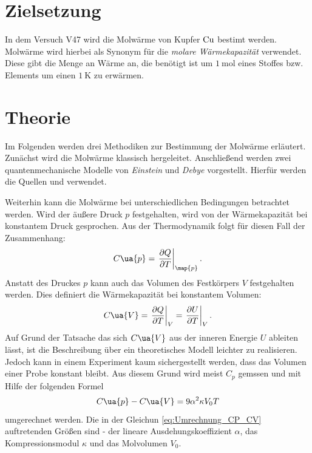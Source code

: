 \setcounter{page}{1}
\section*{Zielsetzung}
In dem Versuch V47 wird die Molwärme von Kupfer $\ce{Cu}$ bestimt werden.
Molwärme wird hierbei als Synonym für die \emph{molare Wärmekapazität} verwendet.
Diese gibt die Menge an Wärme an, die benötigt ist um $\SI{1}{\mol}$ eines Stoffes
bzw. Elements um einen $\SI{1}{\kelvin}$ zu erwärmen.

\section{Theorie}
Im Folgenden werden drei Methodiken zur Bestimmung der Molwärme erläutert.
Zunächst wird die Molwärme klassisch hergeleitet. Anschließend werden zwei
quantenmechanische Modelle von \emph{Einstein} und \emph{Debye}
vorgestellt. Hierfür werden die Quellen \cite{anleitungV47} und \cite[S. 215]{marx} verwendet.

Weiterhin kann die Molwärme bei unterschiedlichen Bedingungen betrachtet werden.
Wird der äußere Druck $p$ festgehalten, wird von der Wärmekapazität bei konstantem
Druck gesprochen. Aus der Thermodynamik folgt für diesen Fall der Zusammenhang:
\begin{equation}
  \label{eq:C_P}
  C\ua{p} = \left.\frac{\partial Q}{\partial T}\right|_{\map{p}}.
\end{equation}
Anstatt des Druckes $p$ kann auch das Volumen des Festkörpers $V$ festgehalten
werden. Dies definiert die Wärmekapazität bei konstantem Volumen:
\begin{equation}
  \label{eq:C_V}
  C\ua{V} = \left.\frac{\partial Q}{\partial T}\right|_{V} = \left. \frac{\partial U}{\partial T}\right|_{V}.
\end{equation}
Auf Grund der Tatsache das sich $C\ua{V}$ aus der inneren Energie $U$ ableiten
lässt, ist die Beschreibung über ein theoretisches Modell leichter zu realisieren.
Jedoch kann in einem Experiment kaum sichergestellt werden, dass das Volumen einer
Probe konstant bleibt. Aus diesem Grund wird meist $C_p$ gemssen und mit Hilfe
der folgenden Formel
\begin{equation}
  \label{eq:Umrechnung_CP_CV}
  C\ua{p} - C\ua{V} = 9\alpha^2 \kappa V_0 T
\end{equation}
umgerechnet werden. Die in der Gleichun \eqref{eq:Umrechnung_CP_CV} auftretenden
Größen sind - der lineare Ausdehungskoeffizient $\alpha$, das Kompressionsmodul
$\kappa$ und das Molvolumen $V_0$.
